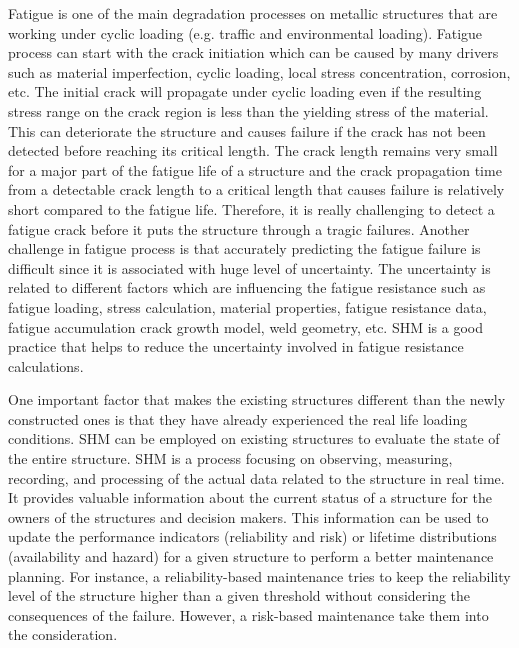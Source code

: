 Fatigue is one of the main degradation processes on metallic structures that are working under cyclic loading (e.g. traffic and environmental loading). Fatigue process can start with the 
crack initiation which can be caused by many drivers such as material imperfection, cyclic loading, local stress concentration, corrosion, etc. The initial crack will propagate under cyclic
loading even if the resulting stress range on the crack region is less than the yielding stress of the material. This can deteriorate the structure and causes failure if the crack has not 
been detected before reaching its critical length. The crack length remains very small for a major part of the fatigue life of a structure and the crack propagation time from a detectable 
crack length to a critical length that causes failure is relatively short compared to the fatigue life. Therefore, it is really challenging to detect a fatigue crack before it puts the 
structure through a tragic failures. Another challenge in fatigue process is that accurately predicting the fatigue failure is difficult since it is associated with huge level of uncertainty. 
The uncertainty is related to different factors which are influencing the fatigue resistance such as fatigue loading, stress calculation, material properties, fatigue resistance data, fatigue 
accumulation crack growth model, weld geometry, etc. \ac{SHM} is a good practice that helps to reduce the uncertainty involved in fatigue resistance calculations. 


One important factor that makes the existing structures different than the newly constructed ones is that they have already experienced the real life loading conditions. \ac{SHM} can be
employed on existing structures to evaluate the state of the entire structure. \ac{SHM} is a process focusing on observing, measuring, recording, and processing of the actual data related to the 
structure in real time. It provides valuable information about the current status of a structure for the owners of the structures and decision makers. This information can be used to update
the performance indicators (reliability and risk) or lifetime distributions (availability and hazard) for a given structure to perform a better maintenance planning. For instance, a 
reliability-based maintenance tries to keep the reliability level of the structure higher than a given threshold without considering the consequences of the failure. However, a risk-based
maintenance take them into the consideration. 


